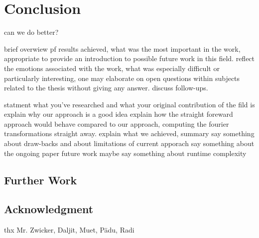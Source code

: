 \chapter{Conclusion}

can we do better?

brief overwiew pf results achieved, what was the most important in the work, appropriate to provide an introduction to possible future work in this field. reflect the emotions associated with the work, what was especially difficult or particularly interesting, one may elaborate on open questions within subjects related to the thesis without giving any answer. discuss follow-ups.

statment what you've researched and what your original contribution of the fild is
explain why our approach is a good idea
explain how the straight foreward approach would behave compared to our approach, computing the fourier transformations straight away.
explain what we achieved, summary
say something about draw-backs and about limitations of current apporach
say something about the ongoing paper future work
maybe say something about runtime complexity

\section{Further Work}



\section{Acknowledgment}
thx Mr. Zwicker, Daljit, Muet, Pädu, Radi
